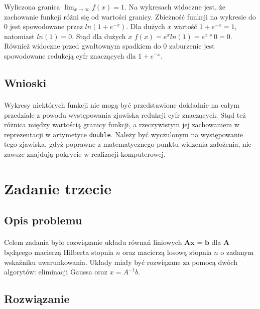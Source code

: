 \documentclass[a4paper]{article}
\begin{document}
Wyliczona granica $\lim_{x \to \infty} f(x) = 1$. Na wykresach widoczne jest, że zachowanie funkcji różni się od wartości granicy. Zbieżność funkcji na wykresie do 0 jest spowodowane przez $ln(1 + e^{-x})$. Dla dużych $x$ wartość $1 + e^{-x} = 1$, natomiast $ln(1) = 0$. Stąd dla dużych $x$ $f(x) = e^xln(1) = e^x * 0 = 0$. Również widoczne przed gwałtownym spadkiem do $0$ zaburzenie jest spowodowane redukcją cyfr znaczących dla $1 + e^{-x}$.
\subsection{Wnioski}
\paragraph{}
Wykresy niektórych funkcji nie mogą być przedstawione dokładnie na całym przedziale z powodu występowania zjawiska redukcji cyfr znaczących. Stąd też różnica między wartością granicy funkcji, a rzeczywistym jej zachowaniem w reprezentacji w artymetyce \texttt{double}. Należy być wyczulonym na występowanie tego zjawiska, gdyż poprawne z matematycznego punktu widzenia założenia, nie zawsze znajdują pokrycie w realizacji komputerowej.
\section{Zadanie trzecie}

\subsection{Opis problemu}
\paragraph{}
Celem zadania było rozwiązanie układu równań liniowych $\textbf{Ax = b}$ dla $\textbf{A}$ będącego macierzą Hilberta stopnia $n$ oraz macierzą losową stopnia $n$ o zadanym wskaźniku uwarunkowania. Układy miały być rozwiązane za pomocą dwóch algorytów: eliminacji Gaussa oraz $x = A^{-1}b$.

\subsection{Rozwiązanie}
\end{document}
